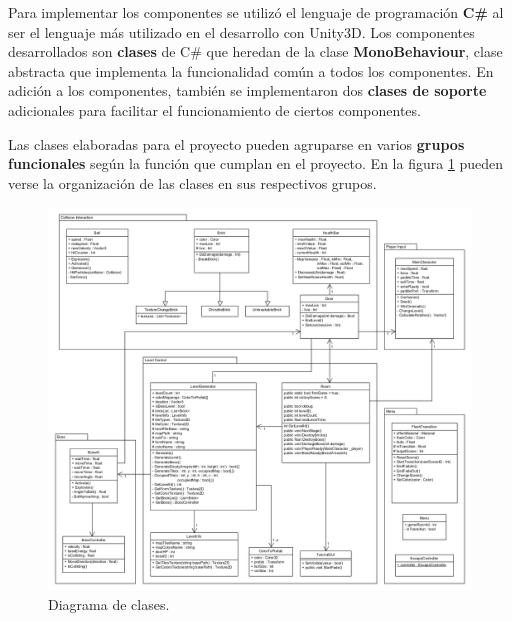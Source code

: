 Para implementar los componentes se utilizó el lenguaje de programación \textbf{C\#} al ser el lenguaje más utilizado en el desarrollo con Unity3D. Los componentes desarrollados son \textbf{clases} de C\# que heredan de la clase \textbf{MonoBehaviour}, clase abstracta que implementa la funcionalidad común a todos los componentes. En adición a los componentes, también se implementaron dos \textbf{clases de soporte} adicionales para facilitar el funcionamiento de ciertos componentes.

Las clases elaboradas para el proyecto pueden agruparse en varios \textbf{grupos funcionales} según la función que cumplan en el proyecto. En la figura \ref{diagrama_clases} pueden verse la organización de las clases en sus respectivos grupos.
\begin{figure}[h]
    \centering
    \includegraphics[width=1\textwidth]{images/estructura/vision/diagram}
    \caption{Diagrama de clases.}
    \label{diagrama_clases}
\end{figure}

